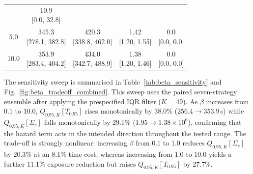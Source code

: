 \documentclass[preprint,12pt]{elsarticle}
\begin{document}
\begin{table}[htbp]
\begin{tabular}{ccccc}
        & \makecell{10.9 \\ {\scriptsize [0.0, 32.8]}} \\
    5.0
        & \makecell{345.3 \\ {\scriptsize [278.1, 382.8]}}
        & \makecell{420.3 \\ {\scriptsize [338.8, 462.0]}}
        & \makecell{1.42 \\ {\scriptsize [1.20, 1.55]}}
        & \makecell{0.0 \\ {\scriptsize [0.0, 0.0]}} \\
    10.0
        & \makecell{353.9 \\ {\scriptsize [283.4, 404.2]}}
        & \makecell{434.0 \\ {\scriptsize [342.7, 488.9]}}
        & \makecell{1.38 \\ {\scriptsize [1.20, 1.46]}}
        & \makecell{0.0 \\ {\scriptsize [0.0, 0.0]}} \\
    \bottomrule
    \end{tabular}
\end{table}


The sensitivity sweep is summarised in
Table~\ref{tab:beta_sensitivity} and
Fig.~\ref{fig:beta_tradeoff_combined}. This sweep uses the paired
seven-strategy ensemble after applying the prespecified IQR filter
($K=49$). As $\beta$ increases from $0.1$
to $10.0$, $Q_{0.95,K}[T_{0.95}]$ rises monotonically by $38.0\%$
($256.4 \to 353.9$\,s) while $Q_{0.95,K}[\Sigma_s]$ falls monotonically by
$29.1\%$ ($1.95 \to 1.38 \times 10^{6}$), confirming that the hazard
term acts in the intended direction throughout the tested range. The
trade-off is strongly nonlinear: increasing $\beta$ from $0.1$ to $1.0$
reduces $Q_{0.95,K}[\Sigma_s]$ by $20.3\%$ at an $8.1\%$ time cost, whereas
increasing from $1.0$ to $10.0$ yields a further $11.1\%$ exposure
reduction but raises $Q_{0.95,K}[T_{0.95}]$ by $27.7\%$.
\end{document}
